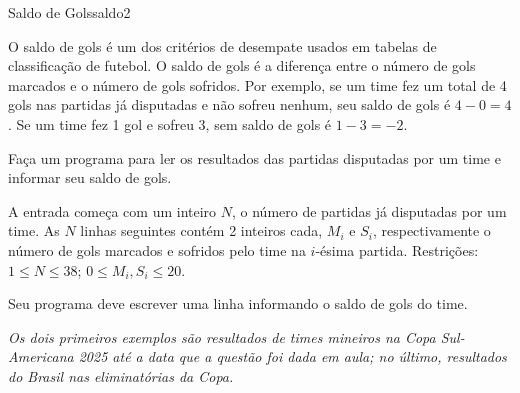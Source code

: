 \documentclass[12pt,a4paper,oneside]{article}
\begin{document}
\begin{problem}{Saldo de Gols}{saldo}{2}

O saldo de gols é um dos critérios de desempate usados em tabelas de classificação de futebol. O saldo de gols é a diferença entre o número de gols marcados e o número de gols sofridos. Por exemplo, se um time fez um total de 4 gols nas partidas já disputadas e não sofreu nenhum, seu saldo de gols é $4-0 = 4$. Se um time fez 1 gol e sofreu 3, sem saldo de gols é $1-3 = -2$.

Faça um programa para ler os resultados das partidas disputadas por um time e informar seu saldo de gols.

%

\InputFile

A entrada começa com um inteiro $N$, o número de partidas já disputadas por um time. As $N$ linhas seguintes contém 2 inteiros cada, $M_i$ e $S_i$, respectivamente o número de gols marcados e sofridos pelo time na $i$-ésima partida. Restrições: $1 \leq N \leq 38$; $0 \leq M_i, S_i \leq 20$.


\OutputFile

Seu programa deve escrever uma linha informando o saldo de gols do time.


\Example

\begin{example}
%
\end{example}

\begin{example}
%
\end{example}

\begin{example}
%
\end{example}


\textit{Os dois primeiros exemplos são resultados de times mineiros na Copa Sul-Americana 2025 até a data que a questão foi dada em aula; no último, resultados do Brasil nas eliminatórias da Copa.}

\end{problem}
\end{document}

